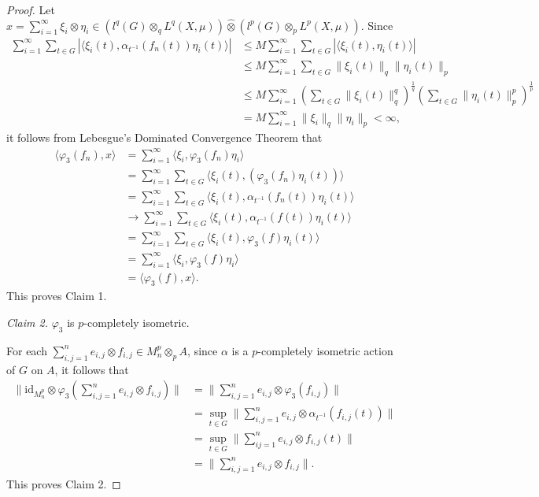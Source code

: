 \documentclass[10pt,a4paper]{amsart}
\newcommand{\la}{\langle}
\newcommand{\ra}{\rangle}
\begin{document}
\begin{proof}
Let $x=\sum_{i=1}^\infty \xi_i\otimes\eta_i\in (l^q(G)\otimes_qL^q(X,\mu))\widehat{\otimes}(l^p(G)\otimes_pL^p(X,\mu))$.
Since $$\begin{aligned} \sum_{i=1}^\infty\sum_{t\in G}|\la\xi_i(t),\alpha_{t^{-1}}(f_n(t))\eta_i(t)\ra|
 &\leq M \sum_{i=1}^\infty\sum_{t\in G}|\la\xi_i(t),\eta_i(t)\ra|\\
 &\leq M\sum_{i=1}^\infty \sum_{t\in G}\|\xi_i(t)\|_q\|\eta_i(t)\|_p\\
 &\leq M\sum_{i=1}^\infty (\sum_{t\in G}\|\xi_i(t)\|_{q}^q)^{\frac{1}{q}}(\sum_{t\in G}\|\eta_i(t)\|_{p}^p)^{\frac{1}{p}}\\
 &=M\sum_{i=1}^\infty \|\xi_i\|_q\|\eta_i\|_p<\infty, \end{aligned}$$
it follows from  Lebesgue's Dominated Convergence Theorem that
$$\begin{aligned} \la \varphi_3(f_n),x\ra
 &=\sum_{i=1}^\infty \la \xi_i,\varphi_3(f_n)\eta_i\ra \\
 &=\sum_{i=1}^\infty \sum_{t\in G}\la\xi_i(t),(\varphi_3(f_n)\eta_i(t))\ra\\
 &=\sum_{i=1}^\infty \sum_{t\in G}\la \xi_i(t),\alpha_{t^{-1}}(f_n(t))\eta_i(t)\ra \\
 &\rightarrow \sum_{i=1}^\infty \sum_{t\in G}\la\xi_i(t),\alpha_{t^{-1}}(f(t))\eta_i(t)\ra\\
 &=\sum_{i=1}^\infty \sum_{t\in G}\la\xi_i(t),\varphi_3(f)\eta_i(t)\ra\\
 &=\sum_{i=1}^\infty \la \xi_i,\varphi_3(f)\eta_i\ra\\
 &=\la \varphi_3(f),x\ra. \end{aligned}$$
This proves Claim 1.

{\it Claim 2.} $\varphi_3$ is $p$-completely isometric.

For each $\sum_{i,j=1}^n e_{i,j}\otimes f_{i,j}\in M_n^p\otimes_p A$, since $\alpha$ is a $p$-completely isometric action of $G$ on $A$, it follows that
$$\begin{aligned}\| \mathrm{id}_{M_n^p}\otimes\varphi_3(\sum_{i,j=1}^n e_{i,j}\otimes f_{i,j})\|
 &=\|\sum_{i,j=1}^n e_{i,j}\otimes \varphi_3(f_{i,j})\|\\
 &=\sup_{t\in G}\|\sum_{i,j=1}^ne_{i,j}\otimes \alpha_{t^{-1}}(f_{i,j}(t))\|\\
 &=\sup_{t\in G}\|\sum_{ij=1}^ne_{i,j}\otimes f_{i,j}(t)\|\\
 &=\|\sum_{i,j=1}^n e_{i,j}\otimes f_{i,j}\|. \end{aligned}$$
This proves Claim 2.




\end{proof}
\end{document}
